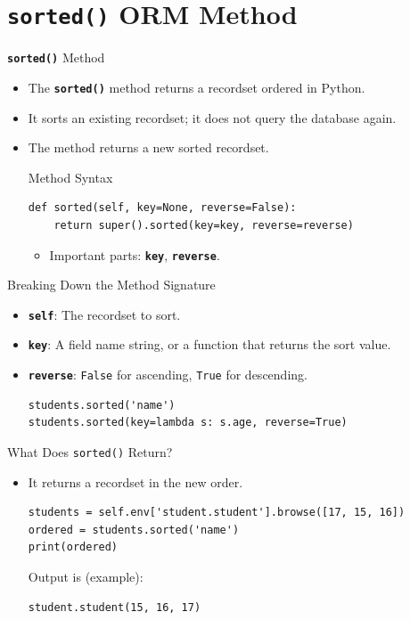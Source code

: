 
\section{\textbf{\texttt{sorted()}} ORM Method}

\begin{frame}[fragile]{\textbf{\texttt{sorted()}} Method}
	\begin{itemize}
		\item The \textbf{\texttt{sorted()}} method returns a recordset ordered in Python.
		\item It sorts an existing recordset; it does not query the database again.
		\item The method returns a new sorted recordset.
\begin{block}{Method Syntax}
\begin{lstlisting}
def sorted(self, key=None, reverse=False):
	return super().sorted(key=key, reverse=reverse)
\end{lstlisting}
	\begin{itemize}
		\item Important parts: \textbf{\texttt{key}}, \textbf{\texttt{reverse}}.
	\end{itemize}
\end{block}
	\end{itemize}
\end{frame}

\begin{frame}[fragile]{Breaking Down the Method Signature}
	\begin{block}{}
		\begin{itemize}
			\item \textbf{\texttt{self}}: The recordset to sort.
			\item \textbf{\texttt{key}}: A field name string, or a function that returns the sort value.
			\item \textbf{\texttt{reverse}}: \texttt{False} for ascending, \texttt{True} for descending.
\begin{lstlisting}
students.sorted('name')
students.sorted(key=lambda s: s.age, reverse=True)
\end{lstlisting}
		\end{itemize}
	\end{block}
\end{frame}

\begin{frame}[fragile]{What Does \texttt{sorted()} Return?}
	\begin{block}{}
		\begin{itemize}
			\item It returns a recordset in the new order.
\begin{lstlisting}
students = self.env['student.student'].browse([17, 15, 16])
ordered = students.sorted('name')
print(ordered)
\end{lstlisting}
			Output is (example):
\begin{lstlisting}
student.student(15, 16, 17)
\end{lstlisting}
		\end{itemize}
	\end{block}
\end{frame}

